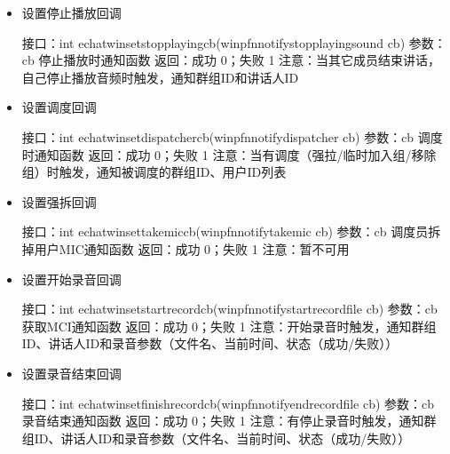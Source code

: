 \documentclass[letterpaper,10pt,english]{sphinxmanual}
\begin{document}
\begin{itemize}
\item {} 
设置停止播放回调

%
\begin{sphinxVerbatim}[commandchars=\\\{\}]
接口：int echat\PYGZus{}win\PYGZus{}set\PYGZus{}stop\PYGZus{}playing\PYGZus{}cb(win\PYGZus{}pfn\PYGZus{}notify\PYGZus{}stop\PYGZus{}playing\PYGZus{}sound cb)
参数：cb 停止播放时通知函数
返回：成功 0；失败 \PYGZhy{}1
注意：当其它成员结束讲话，自己停止播放音频时触发，通知群组ID和讲话人ID
\end{sphinxVerbatim}

\item {} 
设置调度回调

%
\begin{sphinxVerbatim}[commandchars=\\\{\}]
接口：int echat\PYGZus{}win\PYGZus{}set\PYGZus{}dispatcher\PYGZus{}cb(win\PYGZus{}pfn\PYGZus{}notify\PYGZus{}dispatcher cb)
参数：cb 调度时通知函数
返回：成功 0；失败 \PYGZhy{}1
注意：当有调度（强拉/临时加入组/移除组）时触发，通知被调度的群组ID、用户ID列表
\end{sphinxVerbatim}

\item {} 
设置强拆回调

%
\begin{sphinxVerbatim}[commandchars=\\\{\}]
接口：int echat\PYGZus{}win\PYGZus{}set\PYGZus{}take\PYGZus{}mic\PYGZus{}cb(win\PYGZus{}pfn\PYGZus{}notify\PYGZus{}takemic cb)
参数：cb 调度员拆掉用户MIC通知函数
返回：成功 0；失败 \PYGZhy{}1
注意：暂不可用
\end{sphinxVerbatim}

\item {} 
设置开始录音回调

%
\begin{sphinxVerbatim}[commandchars=\\\{\}]
接口：int echat\PYGZus{}win\PYGZus{}set\PYGZus{}start\PYGZus{}record\PYGZus{}cb(win\PYGZus{}pfn\PYGZus{}notify\PYGZus{}start\PYGZus{}recordfile cb)
参数：cb 获取MCI通知函数
返回：成功 0；失败 \PYGZhy{}1
注意：开始录音时触发，通知群组ID、讲话人ID和录音参数（文件名、当前时间、状态（成功/失败））
\end{sphinxVerbatim}

\item {} 
设置录音结束回调

%
\begin{sphinxVerbatim}[commandchars=\\\{\}]
接口：int echat\PYGZus{}win\PYGZus{}set\PYGZus{}finish\PYGZus{}record\PYGZus{}cb(win\PYGZus{}pfn\PYGZus{}notify\PYGZus{}end\PYGZus{}recordfile cb)
参数：cb 录音结束通知函数
返回：成功 0；失败 \PYGZhy{}1
注意：有停止录音时触发，通知群组ID、讲话人ID和录音参数（文件名、当前时间、状态（成功/失败））
\end{sphinxVerbatim}


\end{itemize}
\end{document}
